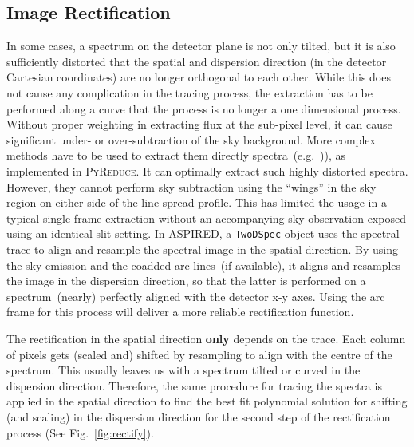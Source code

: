 \documentclass[linenumbers, twocolumn]{aastex631}
\begin{document}
\subsection{Image Rectification}
In some cases, a spectrum on the detector plane is not only tilted, but it is
also sufficiently distorted that the spatial and dispersion direction (in the
detector Cartesian coordinates) are no longer orthogonal to each other. While
this does not cause any complication in the tracing process, the extraction has
to be performed along a curve that the process is no longer a one dimensional
process. Without proper weighting in extracting flux at the sub-pixel level,
it can cause significant under- or over-subtraction of the sky background. More
complex methods have to be used to extract them directly
spectra~(e.g.\ \citet{2021A&A...646A..32P})), as implemented
in \textsc{PyReduce}. It can optimally extract such highly distorted spectra.
However, they cannot perform sky subtraction using the ``wings'' in the sky
region on either side of the line-spread profile. This has limited the usage
in a typical single-frame extraction without an accompanying sky observation
exposed using an identical slit setting. In \textsc{ASPIRED}, a
\texttt{TwoDSpec} object uses the spectral trace to align and resample the
spectral image in the spatial direction. By using the sky emission and the
coadded arc lines~(if available), it aligns and resamples the image in the
dispersion direction, so that the latter is performed on a spectrum~(nearly)
perfectly aligned with the detector x-y axes. Using the arc frame for this
process will deliver a more reliable rectification function.

The rectification in the spatial direction \textbf{only} depends on the trace.
Each column of pixels gets (scaled and) shifted by resampling to align with the
centre of the spectrum. This usually leaves us with a spectrum tilted or curved
in the dispersion direction. Therefore, the same procedure for tracing the
spectra is applied in the spatial direction to find the best fit polynomial
solution for shifting (and scaling) in the dispersion direction for the second
step of the rectification process (See Fig.~\ref{fig:rectify}).
\end{document}
